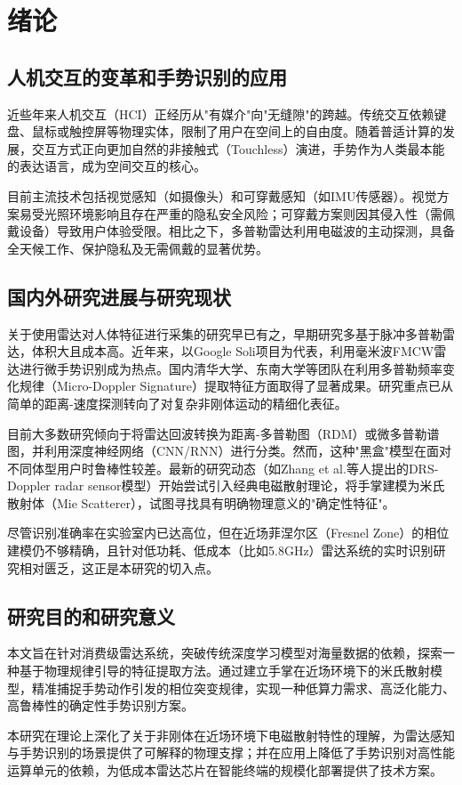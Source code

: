 \section{绪论}

\subsection{人机交互的变革和手势识别的应用}

近些年来人机交互（HCI）正经历从"有媒介"向"无缝隙"的跨越。传统交互依赖键盘、鼠标或触控屏等物理实体，限制了用户在空间上的自由度。随着普适计算的发展，交互方式正向更加自然的非接触式（Touchless）演进，手势作为人类最本能的表达语言，成为空间交互的核心。

目前主流技术包括视觉感知（如摄像头）和可穿戴感知（如IMU传感器）。视觉方案易受光照环境影响且存在严重的隐私安全风险；可穿戴方案则因其侵入性（需佩戴设备）导致用户体验受限。相比之下，多普勒雷达利用电磁波的主动探测，具备全天候工作、保护隐私及无需佩戴的显著优势。

\subsection{国内外研究进展与研究现状}

关于使用雷达对人体特征进行采集的研究早已有之\cite{lin1975noninvasive}，早期研究多基于脉冲多普勒雷达，体积大且成本高。近年来，以Google Soli\cite{lien2016soli}项目为代表，利用毫米波FMCW雷达进行微手势识别成为热点。国内清华大学、东南大学等团队在利用多普勒频率变化规律（Micro-Doppler Signature）\cite{chen2006microdoppler}提取特征方面取得了显著成果。研究重点已从简单的距离-速度探测转向了对复杂非刚体运动的精细化表征。

目前大多数研究倾向于将雷达回波转换为距离-多普勒图（RDM）或微多普勒谱图，并利用深度神经网络（CNN/RNN）进行分类。然而，这种"黑盒"模型在面对不同体型用户时鲁棒性较差。最新的研究动态（如Zhang et al.等人提出的DRS-Doppler radar sensor模型\cite{zhang2021deterministic}）开始尝试引入经典电磁散射理论，将手掌建模为米氏散射体（Mie Scatterer），试图寻找具有明确物理意义的"确定性特征"。

尽管识别准确率在实验室内已达高位，但在近场菲涅尔区（Fresnel Zone）的相位建模仍不够精确，且针对低功耗、低成本（比如5.8GHz）雷达系统的实时识别研究相对匮乏，这正是本研究的切入点。

\subsection{研究目的和研究意义}

本文旨在针对消费级雷达系统，突破传统深度学习模型对海量数据的依赖，探索一种基于物理规律引导的特征提取方法。通过建立手掌在近场环境下的米氏散射模型，精准捕捉手势动作引发的相位突变规律，实现一种低算力需求、高泛化能力、高鲁棒性的确定性手势识别方案。

本研究在理论上深化了关于非刚体在近场环境下电磁散射特性的理解，为雷达感知与手势识别的场景提供了可解释的物理支撑；并在应用上降低了手势识别对高性能运算单元的依赖，为低成本雷达芯片在智能终端的规模化部署提供了技术方案。
